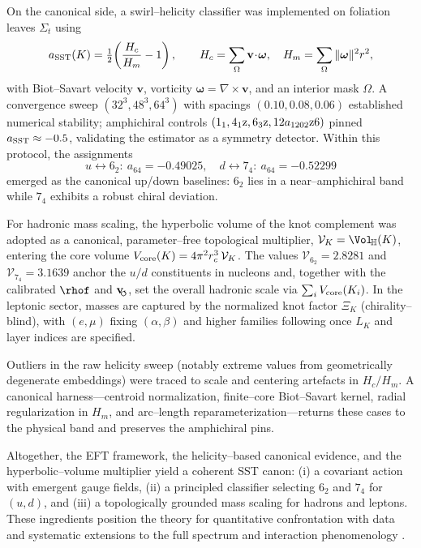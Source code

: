 \documentclass[11pt, preprint,titlepage]{revtex4-2}
\newcommand{\swirlarrow}{\!\!\scriptsize\boldsymbol{\circlearrowleft}}
\newcommand{\vswirl}{\mathbf{v}_{\swirlarrow}}
\begin{document}
    On the canonical side, a swirl–helicity classifier was implemented on foliation leaves \(\Sigma_t\) using
    \[
        a_{\rm SST}(K)=\tfrac12\!\left(\frac{H_c}{H_m}-1\right),\qquad
        H_c=\sum_{\Omega}\mathbf v\!\cdot\!\boldsymbol\omega,\quad
        H_m=\sum_{\Omega}\|\boldsymbol\omega\|^2 r^2,
    \]
    with Biot–Savart velocity \(\mathbf v\), vorticity \(\boldsymbol\omega=\nabla\times\mathbf v\), and an interior mask \(\Omega\). A convergence sweep \((32^3,48^3,64^3)\) with spacings \((0.10,0.08,0.06)\) established numerical stability; amphichiral controls \((1_1,4_1{\rm z},6_3{\rm z},12a_{1202}{\rm z6})\) pinned \(a_{\rm SST}\approx-0.5\), validating the estimator as a symmetry detector. Within this protocol, the assignments
    \[
        u \leftrightarrow 6_2:\ a_{64}=-0.49025,\quad
        d \leftrightarrow 7_4:\ a_{64}=-0.52299
    \]
    emerged as the canonical up/down baselines: \(6_2\) lies in a near–amphichiral band while \(7_4\) exhibits a robust chiral deviation.

    For hadronic mass scaling, the hyperbolic volume of the knot complement was adopted as a canonical, parameter–free topological multiplier,
    \(\mathcal{V}_K=\Vol_{\!\mathbb{H}}(K)\), entering the core volume \(V_{\rm core}(K)=4\pi^2 r_c^3\,\mathcal{V}_K\).
    The values \(\mathcal{V}_{6_2}=2.8281\) and \(\mathcal{V}_{7_4}=3.1639\) anchor the \(u/d\) constituents in nucleons and, together with the calibrated \(\rhof\) and \(\vswirl\), set the overall hadronic scale via \(\sum_i V_{\rm core}(K_i)\).
    In the leptonic sector, masses are captured by the normalized knot factor \(\Xi_K\) (chirality–blind), with \((e,\mu)\) fixing \((\alpha,\beta)\) and higher families following once \(L_K\) and layer indices are specified.

    Outliers in the raw helicity sweep (notably extreme values from geometrically degenerate embeddings) were traced to scale and centering artefacts in \(H_c/H_m\). A canonical harness—centroid normalization, finite–core Biot–Savart kernel, radial regularization in \(H_m\), and arc–length reparameterization—returns these cases to the physical band and preserves the amphichiral pins.

    Altogether, the EFT framework, the helicity–based canonical evidence, and the hyperbolic–volume multiplier yield a coherent SST canon: (i) a covariant action with emergent gauge fields, (ii) a principled classifier selecting \(6_2\) and \(7_4\) for \((u,d)\), and (iii) a topologically grounded mass scaling for hadrons and leptons. These ingredients position the theory for quantitative confrontation with data and systematic extensions to the full spectrum and interaction phenomenology \cite{Barcelo2011,Volovik2003,Faddeev1997,Arnold1998}.
\end{document}
